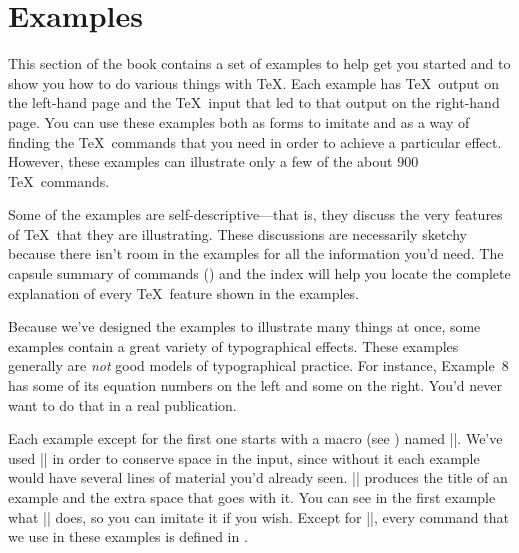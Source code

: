 

\chapter{Examples}


This section of the book contains a set of examples 
to help get you started and to show you how to do various things with \TeX.
Each example has \TeX\ output on the left-hand page and the \TeX \
input that led to that output on the right-hand page.
You can use these examples both as forms to imitate and
as a way of finding the
\TeX\ commands that you need in order to achieve a particular effect.
However, these examples can illustrate only a few of the
about $900$ \TeX\ commands.

Some of the examples are self-descriptive---that is, they discuss the very
features of \TeX\ that they are illustrating.  These discussions are
necessarily sketchy because there isn't room in the examples for all the
information you'd need.  The capsule summary of commands
()
and the index will help you
locate the complete explanation of every \TeX\ feature shown in the
examples.

Because we've designed the examples to illustrate 
many things at once, some examples contain a great variety of
typographical effects.  These examples generally are \emph{not} good
models of typographical practice.  For instance, Example~8 has some of its
equation numbers on the left and some on the right.  You'd never want to
do that in a real publication.

Each example except for the first one starts with a macro (see 
) named |\xmpheader|.  We've used |\xmpheader| in order to
conserve space in the input, since without it each example would have
several lines of material you'd already seen.
|\xmpheader| produces the title of an example and the
extra space that goes with it.  You can see in the first example 
what |\xmpheader| does, so you can imitate it if you wish.
Except for |\xmpheader|, every command that we use in these examples is
defined in \plainTeX.

{%
   \let\bye = \relax %
   \doexamples {xmptext}%
}%


\endchapter
\byebye
